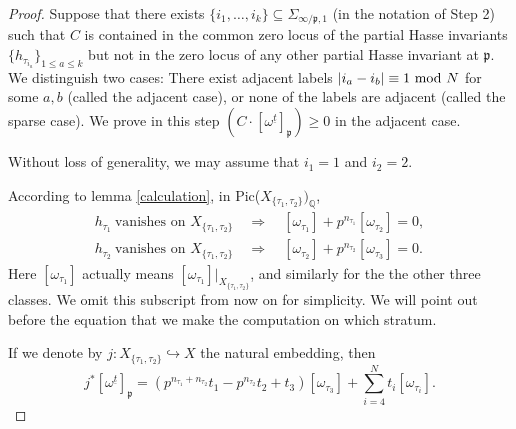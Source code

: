 \documentclass{article}
\begin{document}
\begin{proof}
Suppose that there exists $\{i_1,\dots,i_k\}\subseteq\Sigma_{\infty/\mathfrak{p},1}$ (in the notation of Step 2) such that $C$ is contained in the common zero locus of the partial Hasse invariants $\{h_{\tau_{i_a}}\}_{1\le a\le k}$ but not in the zero locus of any other partial Hasse invariant at $\mathfrak{p}$. We distinguish two cases: There exist adjacent labels $|i_a-i_b|\equiv1 \textnormal{ mod $N$}$ for some $a,b$ (called the adjacent case), or none of the labels are adjacent (called the sparse case). We prove in this step $(C\cdot [\omega^{\underline{t}}]_{\mathfrak{p}})\ge0$ in the adjacent case.

Without loss of generality, we may assume that $i_1=1$ and $i_2=2$.

According to lemma \ref{calculation}, in Pic($X_{\{\tau_1,\tau_2\}})_{\mathbb{Q}}$,
\begin{equation}
\begin{aligned}
h_{\tau_1}\ \textrm{vanishes on $X_{\{\tau_1,\tau_2\}}$}\quad \Rightarrow\quad [\omega_{\tau_1}]+p^{n_{\tau_1}}[\omega_{\tau_2}]=0,\\
h_{\tau_2}\ \textrm{vanishes on $X_{\{\tau_1,\tau_2\}}$}\quad \Rightarrow\quad [\omega_{\tau_2}]+p^{n_{\tau_2}}[\omega_{\tau_3}]=0.
\end{aligned}
\end{equation}
Here $[\omega_{\tau_1}]$ actually means $[\omega_{\tau_1}]|_{X_{\{\tau_1,\tau_2\}}}$, and similarly for the the other three classes. We omit this subscript from now on for simplicity. We will point out before the equation that we make the computation on which stratum.

If we denote by $j:X_{\{\tau_1,\tau_2\}}\hookrightarrow X$ the natural embedding, then
\begin{equation} 
j^\ast[\omega^{\underline{t}}]_\mathfrak{p}=(p^{n_{\tau_1}+n_{\tau_2}}t_1-p^{n_{\tau_2}}t_2+t_3)[\omega_{\tau_3}]+\sum_{i=4}^Nt_i[\omega_{\tau_i}].
\end{equation}



\end{proof}
\end{document}
